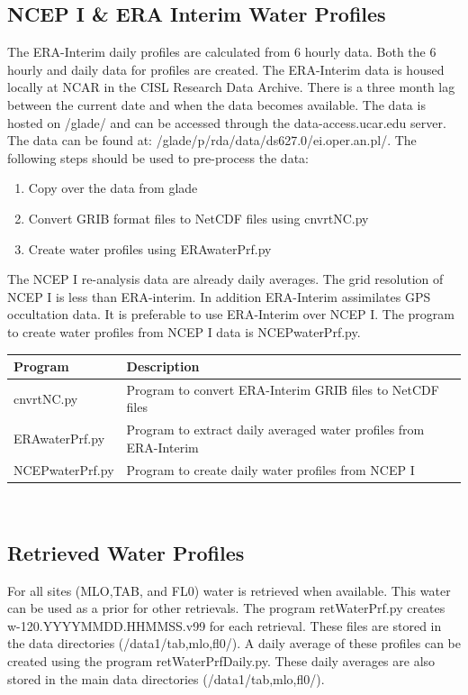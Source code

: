 \documentclass[12pt, letterpaper]{article}
\begin{document}
\subsection{NCEP I \& ERA Interim Water Profiles}
\label{sec:ERAInt}
The ERA-Interim daily profiles are calculated from 6 hourly data. Both the 6 hourly and daily data for profiles are created. The ERA-Interim data is housed locally at NCAR in the CISL Research Data Archive. There is a three month lag between the current date and when the data becomes available. The data is hosted on /glade/ and can be accessed through the data-access.ucar.edu server. The data can be found at: /glade/p/rda/data/ds627.0/ei.oper.an.pl/. The following steps should be used to pre-process the data:\\

\begin{enumerate}
\item Copy over the data from glade
\item Convert GRIB format files to NetCDF files using cnvrtNC.py
\item Create water profiles using ERAwaterPrf.py
\end{enumerate}

The NCEP I re-analysis data are already daily averages. The grid resolution of NCEP I is less than ERA-interim. In addition ERA-Interim assimilates GPS occultation data. It is preferable to use ERA-Interim over NCEP I. The program to create water profiles from NCEP I data is NCEPwaterPrf.py.\\

\begin{tabular}{ l l }
\textbf{Program} & \textbf{Description} \\
\hline
cnvrtNC.py     & Program to convert ERA-Interim GRIB files to NetCDF files\\
ERAwaterPrf.py & Program to extract daily averaged water profiles from ERA-Interim\\
NCEPwaterPrf.py& Program to create daily water profiles from NCEP I\\
\end{tabular} \\


\subsection{Retrieved Water Profiles}
\label{sec:RWP}
For all sites (MLO,TAB, and FL0) water is retrieved when available. This water can be used as a prior for other retrievals. The program retWaterPrf.py creates w-120.YYYYMMDD.HHMMSS.v99 for each retrieval. These files are stored in the data directories (/data1/tab,mlo,fl0/). A daily average of these profiles can be created using the program retWaterPrfDaily.py. These daily averages are also stored in the main data directories (/data1/tab,mlo,fl0/).\\
\end{document}
